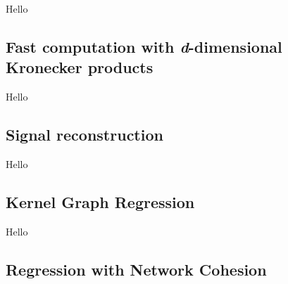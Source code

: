 \label{sec:nd_gsp}

Hello

\subsection{Fast computation with \textit{d}-dimensional Kronecker products}

Hello

\subsection{Signal reconstruction}

Hello

\subsection{Kernel Graph Regression}

Hello

\subsection{Regression with Network Cohesion}


